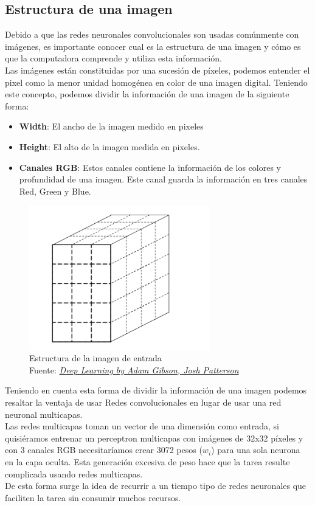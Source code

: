 \subsection{Estructura de una imagen}
Debido a que las redes neuronales convolucionales son usadas comúnmente con imágenes, es importante conocer cual es la estructura de una imagen y cómo es que la computadora comprende y utiliza esta información.\\
Las imágenes están constituidas por una sucesión de píxeles, podemos entender el pixel como la menor unidad homogénea en color de una imagen digital. Teniendo este concepto, podemos dividir la información de una imagen de la siguiente forma:
\begin{itemize}
	\item \textbf{Width}: El ancho de la imagen medido en pixeles
	\item \textbf{Height}: El alto de la imagen medida en pixeles.
	\item \textbf{Canales RGB}: Estos canales contiene la información de los colores y profundidad de una imagen. Este canal guarda la información en tres canales Red, Green y Blue.
\end{itemize}

\begin{figure}[H]
	\centering
	\includegraphics[width=0.7\textwidth]{Figures/image.png}
	\caption{Estructura de la imagen de entrada \\ Fuente:  \href{https://www.safaribooksonline.com/library/view/deep-learning/9781491924570/ch04.html}{\textit{Deep Learning by Adam Gibson, Josh Patterson}}}
	\label{image}
\end{figure} 

Teniendo en cuenta esta forma de dividir la información de una imagen podemos resaltar la ventaja de usar Redes convolucionales en lugar de usar una red neuronal multicapas.\\ Las redes multicapas toman un vector de una dimensión como entrada, si quisiéramos entrenar un perceptron multicapas con imágenes de 32x32 píxeles y con 3 canales RGB necesitaríamos crear 3072 pesos ($w_{i}$) para una sola neurona en la capa oculta. Esta generación excesiva de peso hace que la tarea resulte complicada usando redes multicapas.\\ De esta forma surge la idea de recurrir a un tiempo tipo de redes neuronales que faciliten la tarea sin consumir muchos recursos.
